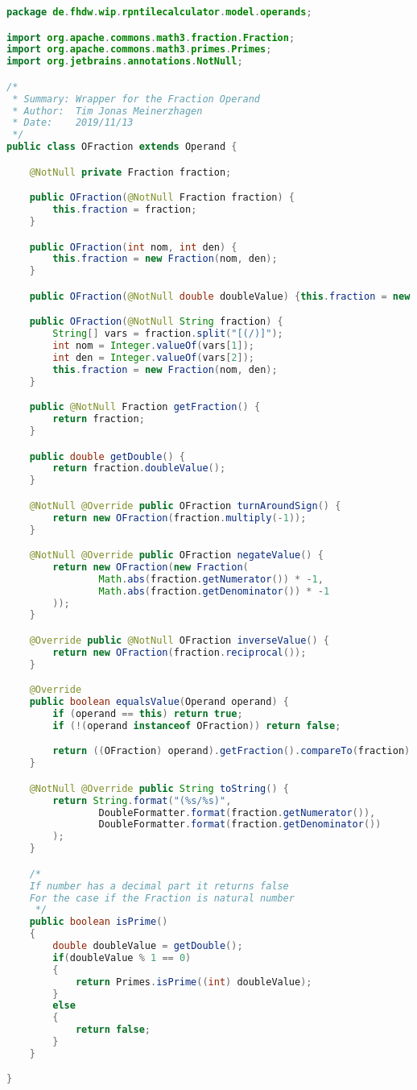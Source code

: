 \begin{lstlisting}[caption=OFraction (Meinerzhagen),label=list:OFraction,language=Java]
package de.fhdw.wip.rpntilecalculator.model.operands;

import org.apache.commons.math3.fraction.Fraction;
import org.apache.commons.math3.primes.Primes;
import org.jetbrains.annotations.NotNull;

/*
 * Summary: Wrapper for the Fraction Operand
 * Author:  Tim Jonas Meinerzhagen
 * Date:    2019/11/13
 */
public class OFraction extends Operand {

    @NotNull private Fraction fraction;

    public OFraction(@NotNull Fraction fraction) {
        this.fraction = fraction;
    }

    public OFraction(int nom, int den) {
        this.fraction = new Fraction(nom, den);
    }

    public OFraction(@NotNull double doubleValue) {this.fraction = new Fraction(doubleValue); }

    public OFraction(@NotNull String fraction) {
        String[] vars = fraction.split("[(/)]");
        int nom = Integer.valueOf(vars[1]);
        int den = Integer.valueOf(vars[2]);
        this.fraction = new Fraction(nom, den);
    }

    public @NotNull Fraction getFraction() {
        return fraction;
    }

    public double getDouble() {
        return fraction.doubleValue();
    }

    @NotNull @Override public OFraction turnAroundSign() {
        return new OFraction(fraction.multiply(-1));
    }

    @NotNull @Override public OFraction negateValue() {
        return new OFraction(new Fraction(
                Math.abs(fraction.getNumerator()) * -1,
                Math.abs(fraction.getDenominator()) * -1
        ));
    }

    @Override public @NotNull OFraction inverseValue() {
        return new OFraction(fraction.reciprocal());
    }

    @Override
    public boolean equalsValue(Operand operand) {
        if (operand == this) return true;
        if (!(operand instanceof OFraction)) return false;

        return ((OFraction) operand).getFraction().compareTo(fraction) == 0;
    }

    @NotNull @Override public String toString() {
        return String.format("(%s/%s)",
                DoubleFormatter.format(fraction.getNumerator()),
                DoubleFormatter.format(fraction.getDenominator())
        );
    }

    /*
    If number has a decimal part it returns false
    For the case if the Fraction is natural number
     */
    public boolean isPrime()
    {
        double doubleValue = getDouble();
        if(doubleValue % 1 == 0)
        {
            return Primes.isPrime((int) doubleValue);
        }
        else
        {
            return false;
        }
    }

}
\end{lstlisting}    

